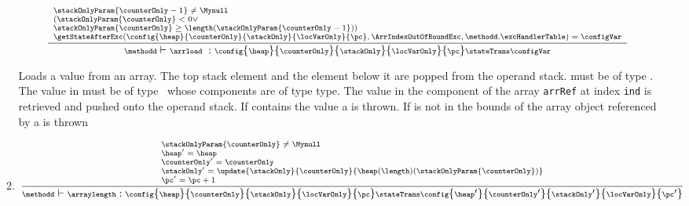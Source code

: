\begin{itemize}
\begin{enumerate}
                $$  {\scriptsize \frac{ \begin{array}{l}   
			      \stackOnlyParam{\counterOnly - 1} \neq \Mynull  \\
			      ( \stackOnlyParam{\counterOnly} < 0 	\vee  \\
			       \stackOnlyParam{\counterOnly} \geq \length (  \stackOnlyParam{\counterOnly - 1}  ) )   \\
			        \getStateAfterExc( \config{\heap}{\counterOnly}{\stackOnly}{\locVarOnly}{\pc}, \ArrIndexOutOfBoundExc ,\methodd.\excHandlerTable ) =  \configVar  
		    \end{array}}
		 {\methodd \vdash  \arrload \ :  \config{\heap}{\counterOnly}{\stackOnly}{\locVarOnly}{\pc} 
			                         \stateTrans  
						 \configVar } } $$					 						 
			
	       
	 

               Loads a value from an array. The top stack element \stackOnlyParam{\counterOnly} and the element below it 
	       are popped from the operand stack.  \stackOnlyParam{\counterOnly} must be of type \Myint. The value in  must be 
               of type  \ whose components are of type \textrm{type}. The value in the component of the array  \texttt{arrRef} 
	       at index \texttt{ind} is retrieved and pushed onto the operand stack.
	       If  contains the value \Mynull a \NullPointerExc is thrown. If \stackOnlyParam{\counterOnly}  is
	       not in the bounds of the array object referenced by   a \ArrIndexOutOfBoundExc is thrown


    \item \arraylength
          $${\scriptsize \frac{ \begin{array}{l}
			   \stackOnlyParam{ \counterOnly } \neq \Mynull  \\
			          \heap' = \heap \\ 
				  \counterOnly'= \counterOnly \\
				  \stackOnly'= \update{\stackOnly}{\counterOnly}{ \heap(\length)( {\stackOnlyParam{\counterOnly} } )  } \\ 
				  \pc' = \pc+ 1
		    \end{array}
	        }
	        {\methodd \vdash \arraylength :  \config{\heap}{\counterOnly}{\stackOnly}{\locVarOnly}{\pc} 
		                  \stateTrans  
				  \config{\heap'}{\counterOnly'}{\stackOnly'}{\locVarOnly}{\pc'} } } $$
		     

\end{enumerate}
\end{itemize}
